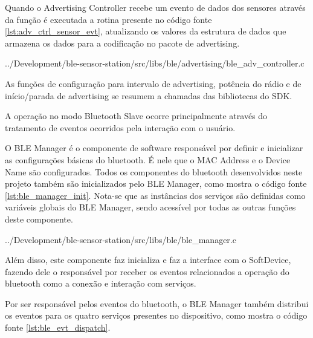 Quando o Advertising Controller recebe um evento de dados dos sensores através
da função  é executada a rotina presente no
código fonte \ref{lst:adv_ctrl_sensor_evt}, atualizando os valores da estrutura
de dados que armazena os dados para a codificação no pacote de advertising.

\begin{minipage}{0.95\linewidth} 

{../Development/ble-sensor-station/src/libs/ble/advertising/ble_adv_controller.c}
\end{minipage}

As funções de configuração para intervalo de advertising, potência do rádio e de
início/parada de advertising se resumem a chamadas das bibliotecas do SDK.


A operação no modo Bluetooth Slave ocorre principalmente através do tratamento
de eventos ocorridos pela interação com o usuário.


O BLE Manager é o componente de software responsável por definir e inicializar
as configurações básicas do bluetooth. É nele que o MAC Address e o Device Name
são configurados. Todos os componentes do bluetooth desenvolvidos neste projeto
também são inicializados pelo BLE Manager, como mostra o código fonte
\ref{lst:ble_manager_init}. Nota-se que as instâncias dos serviços são definidas
como variáveis globais do BLE Manager, sendo acessível por todas as outras
funções deste componente.

\begin{minipage}{0.95\linewidth} 
 
{../Development/ble-sensor-station/src/libs/ble/ble_manager.c}
\end{minipage}



Além disso, este componente faz inicializa e faz a interface
com o SoftDevice, fazendo dele o responsável por receber os eventos relacionados
a operação do bluetooth como a conexão e interação com serviços.

Por ser responsável pelos eventos do bluetooth, o BLE Manager também distribui
os eventos para os quatro serviços presentes no dispositivo, como mostra o
código fonte \ref{lst:ble_evt_dispatch}.

